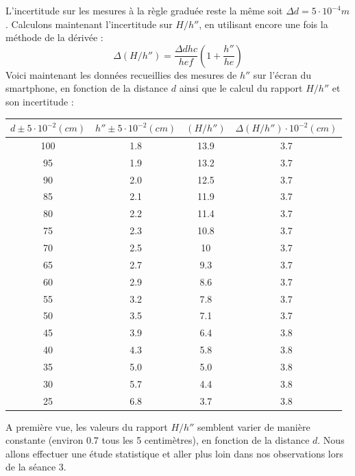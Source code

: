 \documentclass[12pt,a4paper]{article}
\begin{document}
L'incertitude sur les mesures à la règle graduée reste la même soit $\Delta d = 5\cdot 10^{-4}m$. Calculons maintenant l'incertitude sur $H/h''$, en utilisant encore une fois la méthode de la dérivée :$$
\Delta(H/h'')= \frac{\Delta dhc}{hef}\left(1+\frac{h''}{he}\right)$$
Voici maintenant les données recueillies des mesures de $h''$ sur l'écran du smartphone, en fonction de la distance $d$ ainsi que le calcul du rapport $H/h''$ et son incertitude :
\begin{table}[H]
\begin{center}
\begin{tabular}{|c|c|c|c|}
\hline
$d \pm 5\cdot10^{-2}(cm)$ & $h''\pm 5\cdot10^{-2} (cm)$ & $(H/h'')$ & $\Delta (H/h'')\cdot 10^{-2}(cm)$  \\
\hline
100 & 1.8 & 13.9 & 3.7 \\
\hline
95 & 1.9 & 13.2 & 3.7\\
\hline
90 & 2.0 & 12.5 & 3.7 \\
\hline
85 & 2.1 & 11.9 & 3.7\\
\hline
80 & 2.2 & 11.4 & 3.7\\
\hline
75 & 2.3 & 10.8 & 3.7\\
\hline
70 & 2.5 & 10 & 3.7\\
\hline
65 & 2.7 & 9.3 & 3.7\\
\hline
60 & 2.9 & 8.6 & 3.7\\
\hline
55 & 3.2 & 7.8 & 3.7\\
\hline
50 & 3.5 & 7.1 & 3.7\\
\hline
45 & 3.9 & 6.4 & 3.8\\
\hline
40 & 4.3 & 5.8 & 3.8\\
\hline
35 & 5.0 & 5.0 & 3.8\\ 
\hline
30 & 5.7 & 4.4 & 3.8\\
\hline
25 & 6.8 & 3.7 & 3.8\\
\hline
\end{tabular}
\end{center}
\end{table}
A première vue, les valeurs du rapport $H/h''$ semblent varier de manière constante (environ 0.7 tous les 5 centimètres), en fonction de la distance $d$. Nous allons effectuer une étude statistique et aller plus loin dans nos observations lors de la séance 3.
\end{document}
